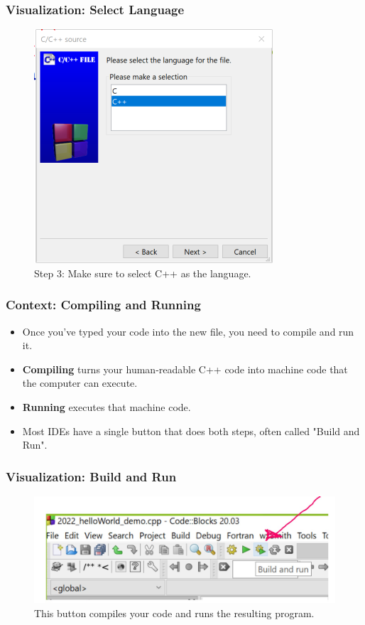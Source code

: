\documentclass{beamer}
\begin{document}
\begin{frame}
\frametitle{Visualization: Select Language}
\begin{figure}
\centering
\includegraphics[width=0.8\linewidth]{cs12-codeblocks-language-selection.png}
\caption{Step 3: Make sure to select C++ as the language.}
\end{figure}
\end{frame}

\begin{frame}
\frametitle{Context: Compiling and Running}
\begin{itemize}
\item Once you've typed your code into the new file, you need to compile and run it.
\item \textbf{Compiling} turns your human-readable C++ code into machine code that the computer can execute.
\item \textbf{Running} executes that machine code.
\item Most IDEs have a single button that does both steps, often called "Build and Run".
\end{itemize}
\end{frame}

\begin{frame}
\frametitle{Visualization: Build and Run}
\begin{figure}
\centering
\includegraphics[width=0.9\linewidth]{cs12-codeblocks-build-and-run.png}
\caption{This button compiles your code and runs the resulting program.}
\end{figure}
\end{frame}
\end{document}
